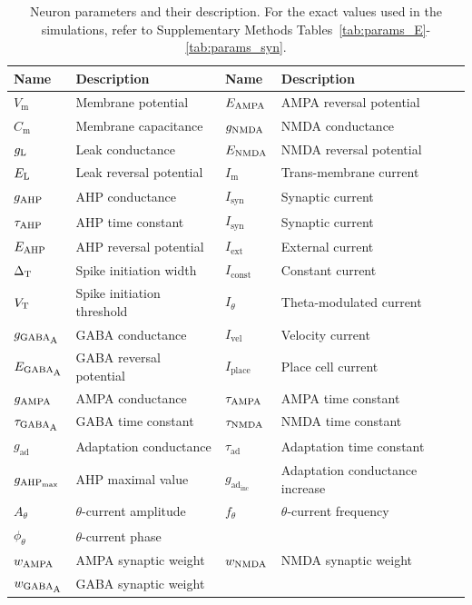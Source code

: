 \documentclass[a4paper,12pt]{article}
\newcommand{\ssc}[3]{\ensuremath{#1_{\text{#2}_{\text{#3}}}}}
\newcommand{\Cm}       {\ssc{C}      {m}     {}}
\newcommand{\Vm}       {\ssc{V}      {m}     {}}
\newcommand{\Imem}     {\ssc{I}      {m}     {}}
\newcommand{\Isyn}     {\ssc{I}      {syn}   {}}
\newcommand{\Iext}     {\ssc{I}      {ext}   {}}
\newcommand{\Iconst}   {\ssc{I}      {const} {}}
\newcommand{\Itheta}   {\ssc{I}      {$\theta$}{}}
\newcommand{\Atheta}   {\ssc{A}      {$\theta$}{}}
\newcommand{\ftheta}   {\ssc{f}      {$\theta$}{}}
\newcommand{\phitheta} {\ssc{\phi}   {$\theta$}{}}
\newcommand{\Ivel}     {\ssc{I}      {vel}   {}}
\newcommand{\Iplace}   {\ssc{I}      {place} {}}
\newcommand{\gL}       {\ssc{g}      {\scriptsize{L}}  {}}
\newcommand{\EL}       {\ssc{E}      {\scriptsize{L}}  {}}
\newcommand{\gAHP}     {\ssc{g}      {\scriptsize{AHP}}{}}
\newcommand{\gAHPmax}  {\ssc{g}      {\scriptsize{AHP}}{max}}
\newcommand{\EAHP}     {\ssc{E}      {\scriptsize{AHP}}{}}
\newcommand{\tauAHP}   {\ssc{\tau}   {\scriptsize{AHP}}{}}
\newcommand{\VT}       {\ssc{V}      {\scriptsize{T}}  {}}
\newcommand{\gGABAA}   {\ssc{g}      {\scriptsize{GABA}}{\scriptsize{A}}}
\newcommand{\EGABAA}   {\ssc{E}      {\scriptsize{GABA}}{\scriptsize{A}}}
\newcommand{\tauGABAA} {\ssc{\tau}   {\scriptsize{GABA}}{\scriptsize{A}}}
\newcommand{\gAMPA}    {\ssc{g}      {\scriptsize{AMPA}}{}}
\newcommand{\EAMPA}    {\ssc{E}      {\scriptsize{AMPA}}{}}
\newcommand{\tauAMPA}  {\ssc{\tau}   {\scriptsize{AMPA}}{}}
\newcommand{\gNMDA}    {\ssc{g}      {\scriptsize{NMDA}}{}}
\newcommand{\ENMDA}    {\ssc{E}      {\scriptsize{NMDA}}{}}
\newcommand{\tauNMDA}  {\ssc{\tau}   {\scriptsize{NMDA}}{}}
\newcommand{\gad}      {\ssc{g}      {ad}{}}
\newcommand{\tauad}    {\ssc{\tau}   {ad}{}}
\newcommand{\gadinc}   {\ssc{g}      {ad}{inc}}
\newcommand{\deltaT}   {\ssc{\Delta} {\scriptsize{T}}{}}
\newcommand{\wAMPA   }{\ssc{w}      {\scriptsize{AMPA}}{}}
\newcommand{\wNMDA   }{\ssc{w}      {\scriptsize{NMDA}}{}}
\newcommand{\wGABAA  }{\ssc{w}      {\scriptsize{GABA}}{\scriptsize{A}}}
\begin{document}
\renewcommand{\tablename}{Supplementary Methods Table}
\begin{table}
    \centering
    \begin{tabular}{l | l || l | l}
        Name       & Description               & Name       & Description               \\
        \hline\hline
        $\Vm$      & Membrane potential        & $\EAMPA$   & AMPA reversal potential   \\
        $\Cm$      & Membrane capacitance      & $\gNMDA$   & NMDA conductance          \\
        $\gL$      & Leak conductance          & $\ENMDA$   & NMDA reversal potential   \\
        $\EL$      & Leak reversal potential   & $\Imem$    & Trans-membrane current    \\
        $\gAHP$    & AHP conductance           & $\Isyn$    & Synaptic current          \\
        $\tauAHP$  & AHP time constant         & $\Isyn$    & Synaptic current          \\
        $\EAHP$    & AHP reversal potential    & $\Iext$    & External current          \\
        $\deltaT$  & Spike initiation width    & $\Iconst$  & Constant current          \\
        $\VT$      & Spike initiation threshold& $\Itheta$  & Theta-modulated current   \\
        $\gGABAA$  & GABA conductance          & $\Ivel$    & Velocity current          \\
        $\EGABAA$  & GABA reversal potential   & $\Iplace$  & Place cell current        \\
        $\gAMPA$   & AMPA conductance          & $\tauAMPA$ & AMPA time constant        \\
        $\tauGABAA$& GABA time constant        & $\tauNMDA$ & NMDA time constant        \\
        $\gad$     & Adaptation conductance    & $\tauad$   & Adaptation time constant  \\
        $\gAHPmax$ & AHP maximal value         & $\gadinc$  & Adaptation conductance increase \\
        $\Atheta$  & $\theta$-current amplitude& $\ftheta$  & $\theta$-current frequency  \\
        $\phitheta$& $\theta$-current phase    &            & \\
        $\wAMPA$   & AMPA synaptic weight      & $\wNMDA$   & NMDA synaptic weight      \\
        $\wGABAA$  & GABA synaptic weight      &            &
    \end{tabular}
    \caption{Neuron parameters and their description. For the exact values used
    in the simulations, refer to Supplementary Methods
    Tables~\ref{tab:params_E}-\ref{tab:params_syn}.}
    \label{tab:neuron_params}
\end{table}
\end{document}
